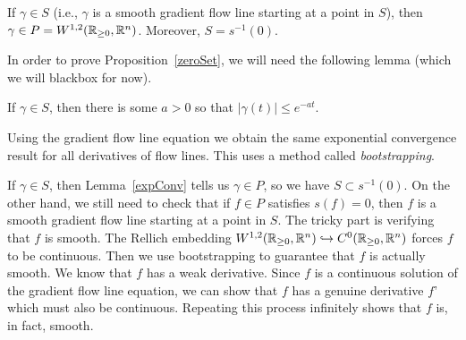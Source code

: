 \begin{prop} \label{zeroSet}
If $\gamma \in S$ (i.e., $\gamma$ is a smooth gradient flow line starting at a point in $S$), then $\gamma \in P=W^{1,2}(\mathbb{R}_{\geq 0},\mathbb{R}^n)$. Moreover, $S=s^{-1}(0)$.
\end{prop}

In order to prove Proposition~\ref{zeroSet}, we will need the following lemma (which we will blackbox for now).

\begin{lemma} \label{expConv}
If $\gamma \in S$, then there is some $a>0$ so that $|\gamma(t)| \leq e^{-at}$.
\end{lemma}

\begin{remark}
Using the gradient flow line equation we obtain the same exponential convergence result for all derivatives of flow lines. This uses a method called \emph{bootstrapping}.
\end{remark}

If $\gamma \in S$, then Lemma~\ref{expConv} tells us $\gamma \in P$, so we have $S \subset s^{-1}(0)$. On the other hand, we still need to check that if $f \in P$ satisfies $s(f)=0$, then $f$ is a smooth gradient flow line starting at a point in $S$. The tricky part is verifying that $f$ is smooth. The Rellich embedding $W^{1,2}(\mathbb{R}_{\geq 0},\mathbb{R}^n) \hookrightarrow C^0(\mathbb{R}_{\geq 0},\mathbb{R}^n)$ forces $f$ to be continuous. Then we use bootstrapping to guarantee that $f$ is actually smooth. We know that $f$ has a weak derivative. Since $f$ is a continuous solution of the gradient flow line equation, we can show that $f$ has a genuine derivative $f$' which must also be continuous. Repeating this process infinitely shows that $f$ is, in fact, smooth.
